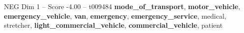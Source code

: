 \begin{textsample}{NEG Dim 1 – Score -4.00 – t009484}  \label{ex:f1_neg_015}
\textbf{mode\_of\_transport}, \textbf{motor\_vehicle}, \textbf{emergency\_vehicle}, \textbf{van}, \textbf{emergency}, \textbf{emergency\_service}, medical, stretcher, \textbf{light\_commercial\_vehicle}, \textbf{commercial\_vehicle}, patient

\end{textsample}
